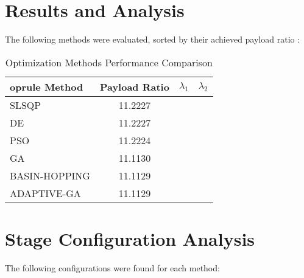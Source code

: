 \documentclass[11pt]{article}
\begin{document}
\section{Results and Analysis}
The following methods were evaluated, sorted by their achieved payload ratio \cite{pso_ascent_2013}:

\begin{table}[H]
\centering
\caption{Optimization Methods Performance Comparison}
\begin{tabular}{lccc}
	oprule
Method & Payload Ratio & $\lambda_{1}$ & $\lambda_{2}$ \\
\midrule
SLSQP & 11.2227 \\
DE & 11.2227 \\
PSO & 11.2224 \\
GA & 11.1130 \\
BASIN-HOPPING & 11.1129 \\
ADAPTIVE-GA & 11.1129 \\
\bottomrule
\end{tabular}
\end{table}

\section{Stage Configuration Analysis}
The following configurations were found for each method:
\end{document}
